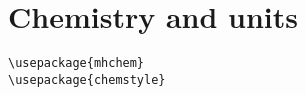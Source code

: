\section{Chemistry and units}

\begin{verbatim}
\usepackage{mhchem}
\usepackage{chemstyle}
\end{verbatim}